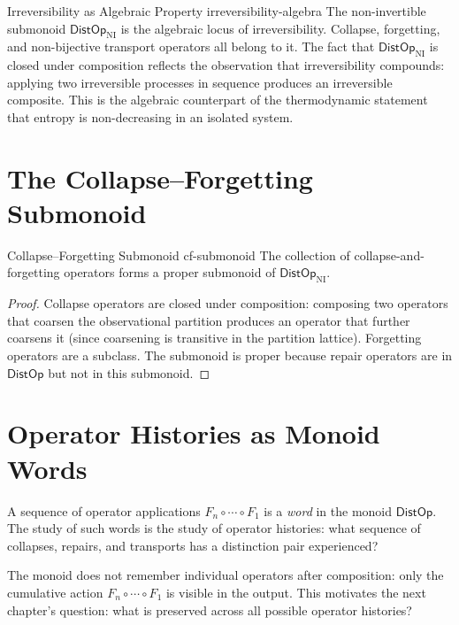 \documentclass[12pt,twoside,openright]{book}
\newcommand{\distOp}{\mathsf{DistOp}}
\providecommand{\distOpNI}{\distOp_{\mathrm{NI}}}
\begin{document}
\begin{remark}{Irreversibility as Algebraic Property}%
  {irreversibility-algebra}
The non-invertible submonoid $\distOpNI$ is the algebraic locus
of irreversibility. Collapse, forgetting, and non-bijective
transport operators all belong to it. The fact that $\distOpNI$
is closed under composition reflects the observation that
irreversibility compounds: applying two irreversible processes
in sequence produces an irreversible composite. This is the
algebraic counterpart of the thermodynamic statement that
entropy is non-decreasing in an isolated system.
\end{remark}

\section{The Collapse--Forgetting Submonoid}

\begin{proposition}{Collapse--Forgetting Submonoid}%
  {cf-submonoid}
The collection of collapse-and-forgetting operators forms a
proper submonoid of $\distOpNI$.
\begin{proof}
Collapse operators are closed under composition: composing two
operators that coarsen the observational partition produces
an operator that further coarsens it (since coarsening is
transitive in the partition lattice). Forgetting operators
are a subclass. The submonoid is proper because repair
operators are in $\distOp$ but not in this submonoid.
\end{proof}
\end{proposition}

\section{Operator Histories as Monoid Words}

A sequence of operator applications $F_n\circ\cdots\circ F_1$
is a \emph{word} in the monoid $\distOp$. The study of such
words is the study of operator histories: what sequence of
collapses, repairs, and transports has a distinction pair
experienced?

The monoid does not remember individual operators after
composition: only the cumulative action $F_n\circ\cdots\circ F_1$
is visible in the output. This motivates the next chapter's
question: what is preserved across all possible operator
histories?
\end{document}
